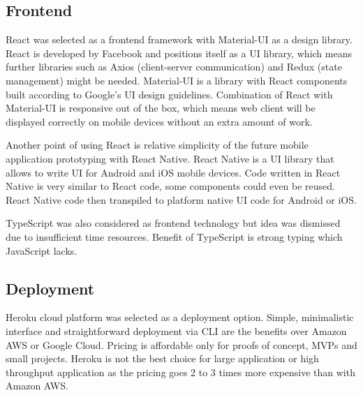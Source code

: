 \subsection{Frontend}\label{subsec:ts-frontend}

React was selected as a frontend framework with Material-UI as a design library.\cite{react, material}
React is developed by Facebook and positions itself as a UI library, which means further libraries such as Axios (client-server communication) and Redux (state management) might be needed.\cite{axios, redux}
Material-UI is a library with React components built according to Google's UI design guidelines.
Combination of React with Material-UI is responsive out of the box, which means web client will be displayed correctly on mobile devices without an extra amount of work.

Another point of using React is relative simplicity of the future mobile application prototyping with React Native.\cite{react-native}
React Native is a UI library that allows to write UI for Android and iOS mobile devices.
Code written in React Native is very similar to React code, some components could even be reused.
React Native code then transpiled to platform native UI code for Android or iOS\@.

TypeScript was also considered as frontend technology but idea was dismissed due to insufficient time resources.
Benefit of TypeScript is strong typing which JavaScript lacks.\cite{typescript}

\subsection{Deployment}\label{subsec:ts-deployment}

Heroku cloud platform was selected as a deployment option.
Simple, minimalistic interface and straightforward deployment via CLI are the benefits over Amazon AWS or Google Cloud.
Pricing is affordable only for proofs of concept, MVPs and small projects.
Heroku is not the best choice for large application or high throughput application as the pricing goes 2 to 3 times more expensive than with Amazon AWS\@.
